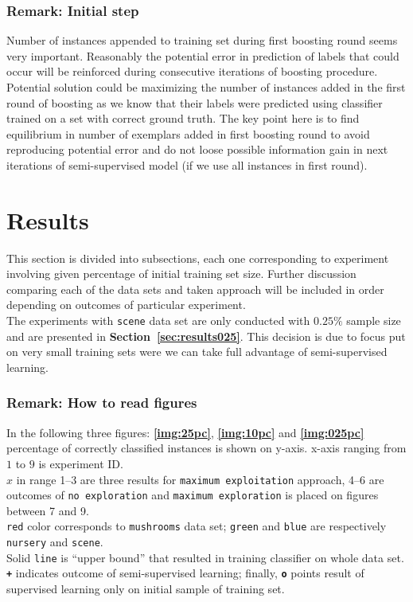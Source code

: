 \documentclass[12pt, a4paper, pdflatex]{report}
\begin{document}
\subsubsection{Remark: Initial step}
Number of instances appended to training set during first boosting round seems very important. Reasonably the potential error in prediction of labels that could occur will be reinforced during consecutive iterations of boosting procedure. Potential solution could be maximizing the number of instances added in the first round of boosting as we know that their labels were predicted using classifier trained on a set with correct ground truth. The key point here is to find equilibrium in number of exemplars added in first boosting round to avoid reproducing potential error and do not loose possible information gain in next iterations of semi-supervised model (if we use all instances in first round).

\section{Results~\cite{results} \label{sec:results}}
This section is divided into subsections, each one corresponding to experiment involving given percentage of initial training set size. Further discussion comparing each of the data sets and taken approach will be included in order depending on outcomes of particular experiment.\\

The experiments with \texttt{scene} data set are only conducted with $0.25\%$ sample size and are presented in \textbf{Section~\ref{sec:results025}}. This decision is due to focus put on very small training sets were we can take full advantage of semi-supervised learning.

\subsubsection{Remark: How to read figures}
In the following three figures: \textbf{\ref{img:25pc}}, \textbf{\ref{img:10pc}} and \textbf{\ref{img:025pc}} percentage of correctly classified instances is shown on y-axis. x-axis ranging from $1$ to $9$ is experiment ID.\\
$x$ in range 1--3 are three results for \texttt{maximum exploitation} approach, 4--6 are outcomes of \texttt{no exploration} and \texttt{maximum exploration} is placed on figures between 7 and 9.\\
\texttt{red} color corresponds to \texttt{mushrooms} data set; \texttt{green} and \texttt{blue} are respectively \texttt{nursery} and \texttt{scene}.\\
Solid \texttt{line} is ``upper bound'' that resulted in training classifier on whole data set. \texttt{\textbf{+}} indicates outcome of semi-supervised learning; finally, \texttt{\textbf{o}} points result of supervised learning only on initial sample of training set.
\end{document}
